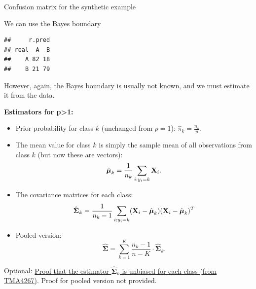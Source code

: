 \documentclass[10pt,ignorenonframetext,]{beamer}
\newenvironment{Shaded}{\begin{snugshade}}{\end{snugshade}}
\newcommand{\KeywordTok}[1]{\textcolor[rgb]{0.13,0.29,0.53}{\textbf{#1}}}
\newcommand{\DataTypeTok}[1]{\textcolor[rgb]{0.13,0.29,0.53}{#1}}
\newcommand{\DecValTok}[1]{\textcolor[rgb]{0.00,0.00,0.81}{#1}}
\newcommand{\StringTok}[1]{\textcolor[rgb]{0.31,0.60,0.02}{#1}}
\newcommand{\OperatorTok}[1]{\textcolor[rgb]{0.81,0.36,0.00}{\textbf{#1}}}
\newcommand{\NormalTok}[1]{#1}
\begin{document}
\begin{frame}[fragile]

\begin{block}{Confusion matrix for the synthetic example}

\vspace{2mm}

We can use the Bayes boundary

\scriptsize

\begin{Shaded}
\end{Shaded}

\begin{verbatim}
##     r.pred
## real  A  B
##    A 82 18
##    B 21 79
\end{verbatim}

\normalsize
However, again, the Bayes boundary is usually not known, and we must
estimate it from the data.

\end{block}

\end{frame}

\begin{frame}

\textbf{Estimators for p\textgreater{}1:}

\begin{itemize}
\item
  Prior probability for class \(k\) (unchanged from \(p=1\)):
  \(\hat{\pi}_k = \frac{n_k}{n}.\)
\item
  The mean value for class \(k\) is simply the sample mean of all
  observations from class \(k\) (but now these are vectors):
  \[\hat{\boldsymbol{\mu}}_k = \frac{1}{n_k}\sum_{i:y_i=k} {\bf X}_i.\]
\item
  The covariance matrices for each class:
  \[\hat{\boldsymbol{\Sigma}}_k=\frac{1}{n_k-1}\sum_{i:y_i=k} ({\bf X}_i-\hat{\boldsymbol{\mu}}_k ) ({\bf X}_i-\hat{\boldsymbol{\mu}}_k)^T\]
\item
  Pooled version:
  \[\hat{\boldsymbol{\Sigma}}= \sum_{k=1}^K \frac{n_k - 1}{n - K} \cdot \hat{\boldsymbol{\Sigma}}_k.\]
\end{itemize}

Optional:
\href{https://www.math.ntnu.no/emner/TMA4268/2018v/notes/ProofMeanS.pdf}{Proof
that the estimator \(\hat{\boldsymbol{\Sigma}}_k\) is unbiased for each
class (from TMA4267)}. Proof for pooled version not provided.

\end{frame}
\end{document}
